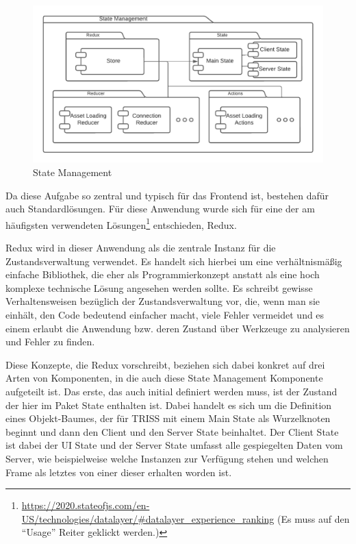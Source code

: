 \begin{figure}[htb]
    \centering
    \includegraphics[scale=.65,center]{medien/state-management.pdf}
    \caption{State Management}
    \ownsource
    \label{fig:state-management}
\end{figure}


Da diese Aufgabe so zentral und typisch für das Frontend ist, bestehen dafür auch Standardlösungen.
Für diese Anwendung wurde sich für eine der am \helptex häufigsten verwendeten Lösungen\footnote{\url{https://2020.stateofjs.com/en-US/technologies/datalayer/\#datalayer_experience_ranking} (Es muss auf den \enquote{Usage} Reiter geklickt werden.)} entschieden, Redux.

Redux wird in dieser Anwendung als die zentrale Instanz für die Zustandsverwaltung verwendet.
Es handelt sich hierbei um eine verhältnismäßig einfache Bibliothek, die eher als Programmierkonzept anstatt als eine hoch komplexe technische Lösung angesehen werden sollte.
Es schreibt gewisse Verhaltensweisen bezüglich der Zustandsverwaltung vor, die, wenn man sie einhält, den Code bedeutend einfacher macht, viele Fehler vermeidet und es einem erlaubt die Anwendung bzw. deren Zustand über Werkzeuge zu analysieren und Fehler zu finden.

Diese Konzepte, die Redux vorschreibt, beziehen sich dabei konkret auf drei Arten von Komponenten, in die auch diese State Management Komponente aufgeteilt ist.
Das erste, das auch initial definiert werden muss, ist der Zustand der hier im Paket State enthalten ist.
Dabei handelt es sich um die Definition eines Objekt-Baumes, der für TRISS mit einem Main State als Wurzelknoten beginnt und dann den Client und den Server State beinhaltet.
Der Client State ist dabei der UI State und der Server State umfasst alle gespiegelten Daten vom Server, wie beispielweise welche Instanzen zur Verfügung stehen und welchen Frame als letztes von einer dieser erhalten worden ist.

